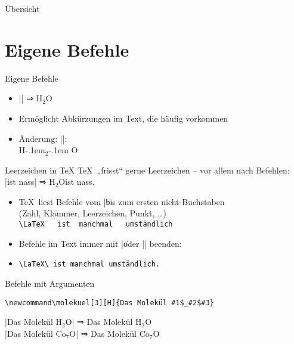 \documentclass[
	vorläufig=true,
	datum=2016-11-04,
	titel={Mathematiksatz I},
	web=false,
]{../tex/latexkurs-slides}
\begin{document}
\begin{frame}{Übersicht}
	\tableofcontents
\end{frame}

\section{Eigene Befehle}
\begin{frame}[fragile]{Eigene Befehle}
\begin{itemize}
\item |\newcommand{\wasser}{H$_2$O}| ⇒ H$_2$O
\item Ermöglicht Abkürzungen im Text, die häufig vorkommen\pause
\item Änderung: |\renewcommand{\wasser}{H\kern-.1em$_2$\kern-.1em O}|:\\ H\kern-.1em$_2$\kern-.1em O
\end{itemize} 
\end{frame}

\begin{frame}[fragile,t]{Leerzeichen in \TeX}
\TeX\ „frisst“ gerne Leerzeichen – vor allem nach Befehlen:\\
|\wasser ist nass| ⇒ H$_2$Oist nass.

\pause
\begin{itemize}
\item<+-> \TeX\ liest Befehle vom |\| bis zum ersten nicht-Buchstaben%
\\ (Zahl, Klammer, Leerzeichen, Punkt, \dots)
\\ \verb*|\LaTeX   ist  manchmal   umständlich|%
\item<+-> Befehle im Text immer mit |\| oder |{}| beenden:
\item<+-> \verb*|\LaTeX\ ist manchmal umständlich.|
\end{itemize}
\begin{block}{}
\end{block}
\end{frame}

\begin{frame}[fragile]{Befehle mit Argumenten}
\begin{lstlisting}
\newcommand\molekuel[3][H]{Das Molekül #1$_#2$#3}
\end{lstlisting}
\newcommand\molekuel[3][H]{Das Molekül #1$_#2$#3}
|\molekuel{2}{O}| ⇒ \molekuel{2}{O}\\
|\molekuel[Co]{7}{O}| ⇒ \molekuel[Co]{7}{O}\\
\end{frame}
\end{document}
